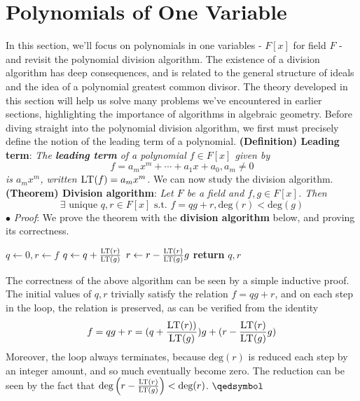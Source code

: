 \documentclass{article}
\begin{document}
\section{Polynomials of One Variable}
In this section, we'll focus on polynomials in one variables - $ F[x] $ for field $ F $ - and revisit the polynomial division algorithm. The existence of a division algorithm has deep consequences, and is related to the general structure of ideals and the idea of a polynomial greatest common divisor. The theory developed in this section will help us solve many problems we've encountered in earlier sections, highlighting the importance of algorithms in algebraic geometry. Before diving straight into the polynomial division algorithm, we first must precisely define the notion of the leading term of a polynomial.
\newline \newline
\textbf{(Definition) Leading term}: \textit{The \textbf{leading term} of a polynomial $ f \in F[x] $ given by}
$$ f = a_m x^m + \cdots + a_1 x + a_0, a_m \neq 0 $$
\indent \textit{is $ a_m x^m $, written $ \textproc{LT}(f) = a_m x^m $.}
\newline \newline
We can now study the division algorithm.
\newline \newline
\textbf{(Theorem) Division algorithm}: \textit{Let $ F $ be a field and $ f, g \in F[x] $. Then}
$$ \exists \text{ unique } q, r \in F[x] \text{ s.t. } f = q g + r, \text{deg}(r) < \text{deg}(g) $$
\indent $ \bullet $ \textit{Proof}: We prove the theorem with the \textbf{division algorithm} below, and proving its correctness.
\begin{algorithmic}
		\State $ q \gets 0, r \gets f $
			\State $ q \gets q + \frac{\textproc{LT}(r)}{\textproc{LT}(g)} $
			\State $ r \gets r - \frac{\textproc{LT}(r)}{\textproc{LT}(g)} g $
		\EndWhile
		\State \textbf{return} $ q, r $
	\EndProcedure
\end{algorithmic}
The correctness of the above algorithm can be seen by a simple inductive proof. The initial values of $ q, r $ trivially satisfy the relation $ f = q g + r $, and on each step in the  loop, the relation is preserved, as can be verified from the identity
$$ f = q g + r = (q + \frac{\textproc{LT}(r))}{\textproc{LT}(g)}) g + (r - \frac{\textproc{LT}(r)}{\textproc{LT}(g)} g) $$
Moreover, the loop always terminates, because $ \text{deg}(r) $ is reduced each step by an integer amount, and so much eventually become zero. The reduction can be seen by the fact that $ \text{deg} \left( r - \frac{\textproc{LT}(r)}{\textproc{LT}(g)} \right) < \text{deg}(r) $. $ \qedsymbol $
\end{document}
